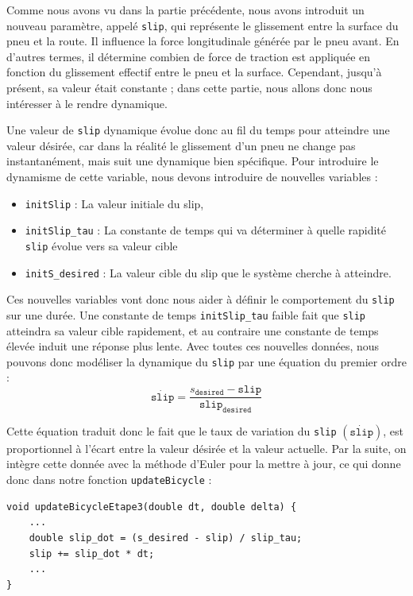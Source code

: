 Comme nous avons vu dans la partie précédente, nous avons introduit un nouveau paramètre, appelé \texttt{slip}, qui représente le glissement entre la surface du pneu et la route. Il influence la force longitudinale générée par le pneu avant. En d'autres termes, il détermine combien de force de traction est appliquée en fonction du glissement effectif entre le pneu et la surface. Cependant, jusqu'à présent, sa valeur était constante ; dans cette partie, nous allons donc nous intéresser à le rendre dynamique.

Une valeur de \texttt{slip} dynamique évolue donc au fil du temps pour atteindre une valeur désirée, car dans la réalité le glissement d'un pneu ne change pas instantanément, mais suit une dynamique bien spécifique. Pour introduire le dynamisme de cette variable, nous devons introduire de nouvelles variables :

\begin{itemize}
\item \texttt{initSlip} : La valeur initiale du slip,

\item \texttt{initSlip\_tau} : La constante de temps qui va déterminer à quelle rapidité \texttt{slip} évolue vers sa valeur cible

\item \texttt{initS\_desired} : La valeur cible du slip que le système cherche à atteindre.

\end{itemize}

Ces nouvelles variables vont donc nous aider à définir le comportement du \texttt{slip} sur une durée.
Une constante de temps \texttt{initSlip\_tau} faible fait que \texttt{slip} atteindra sa valeur cible rapidement, et au contraire une constante de temps élevée induit une réponse plus lente.
Avec toutes ces nouvelles données, nous pouvons donc modéliser la dynamique du \texttt{slip} par une équation du premier ordre :
$$\dot{\texttt{slip}} = \frac{s_{\texttt{desired}} - \texttt{slip}}{\texttt{slip}_{\texttt{desired}}}$$

Cette équation traduit donc le fait que le taux de variation du \texttt{slip} $(\dot{\texttt{slip}})$, est proportionnel à l'écart entre la valeur désirée et la valeur actuelle.
Par la suite, on intègre cette donnée avec la méthode d'Euler pour la mettre à jour, ce qui donne donc dans notre fonction \texttt{updateBicycle} :

\begin{lstlisting}[style=CStyle,label={lst:code_update_bicycle_etape3}]
void updateBicycleEtape3(double dt, double delta) {
    ...
    double slip_dot = (s_desired - slip) / slip_tau;
    slip += slip_dot * dt;
    ...
}
\end{lstlisting}

